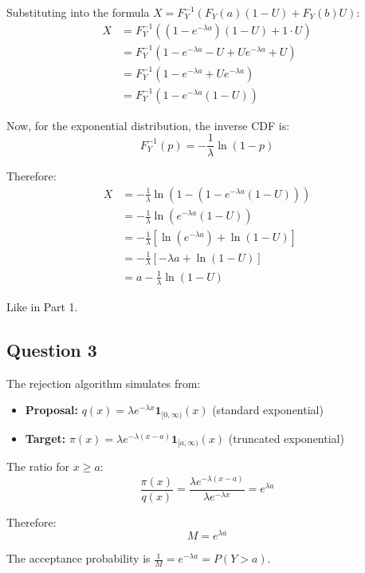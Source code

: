 Substituting into the formula $X = F_Y^{-1}(F_Y(a)(1-U) + F_Y(b)U)$:
\begin{align*}
X &= F_Y^{-1}((1 - e^{-\lambda a})(1-U) + 1 \cdot U)\\
&= F_Y^{-1}(1 - e^{-\lambda a} - U + Ue^{-\lambda a} + U)\\
&= F_Y^{-1}(1 - e^{-\lambda a} + Ue^{-\lambda a})\\
&= F_Y^{-1}(1 - e^{-\lambda a}(1-U))
\end{align*}

Now, for the exponential distribution, the inverse CDF is:
\begin{equation*}
F_Y^{-1}(p) = -\frac{1}{\lambda}\ln(1-p)
\end{equation*}

Therefore:
\begin{align*}
X &= -\frac{1}{\lambda}\ln(1 - (1 - e^{-\lambda a}(1-U)))\\
&= -\frac{1}{\lambda}\ln(e^{-\lambda a}(1-U))\\
&= -\frac{1}{\lambda}[\ln(e^{-\lambda a}) + \ln(1-U)]\\
&= -\frac{1}{\lambda}[-\lambda a + \ln(1-U)]\\
&= a - \frac{1}{\lambda}\ln(1-U)
\end{align*}

Like in Part 1.

\subsection*{Question 3}
The rejection algorithm simulates from:
\begin{itemize}
\item \textbf{Proposal:} $q(x) = \lambda e^{-\lambda x} \mathbf{1}_{[0,\infty)}(x)$ (standard exponential)
\item \textbf{Target:} $\pi(x) = \lambda e^{-\lambda(x-a)} \mathbf{1}_{[a,\infty)}(x)$ (truncated exponential)
\end{itemize}

The ratio for $x \geq a$:
\begin{equation*}
\frac{\pi(x)}{q(x)} = \frac{\lambda e^{-\lambda(x-a)}}{\lambda e^{-\lambda x}} = e^{\lambda a}
\end{equation*}

Therefore:
\begin{equation*}
M = e^{\lambda a}
\end{equation*}

The acceptance probability is $\frac{1}{M} = e^{-\lambda a} = P(Y > a)$.

